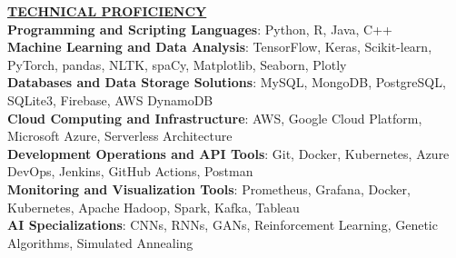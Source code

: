\documentclass{article}
\begin{document}
% 
%
\noindent \textbf{\underline{TECHNICAL PROFICIENCY}} \\
\textbf{Programming and Scripting Languages}{: \small Python, R, Java, C++} \\
\textbf{Machine Learning and Data Analysis}{: \small TensorFlow, Keras, Scikit-learn, PyTorch, pandas, NLTK, spaCy, Matplotlib, Seaborn, Plotly} \\
\textbf{Databases and Data Storage Solutions}{: \small MySQL, MongoDB, PostgreSQL, SQLite3, Firebase, AWS DynamoDB} \\
\textbf{Cloud Computing and Infrastructure}{: \small AWS, Google Cloud Platform, Microsoft Azure, Serverless Architecture} \\
\textbf{Development Operations and API Tools}{: \small Git, Docker, Kubernetes, Azure DevOps, Jenkins, GitHub Actions, Postman} \\
\textbf{Monitoring and Visualization Tools}{: \small Prometheus, Grafana, Docker, Kubernetes, Apache Hadoop, Spark, Kafka, Tableau} \\
\textbf{AI Specializations}{: \small CNNs, RNNs, GANs, Reinforcement Learning, Genetic Algorithms, Simulated Annealing} 
\vspace{2mm} 

\end{document}
